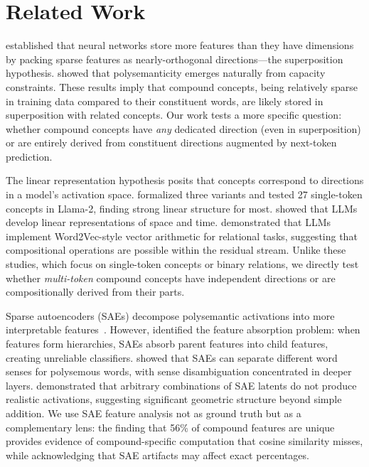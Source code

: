 \section{Related Work}
\label{sec:related_work}

\citet{elhage2022superposition} established that neural networks store more features than they have dimensions by packing sparse features as nearly-orthogonal directions---the superposition hypothesis.
\citet{scherlis2022polysemanticity} showed that polysemanticity emerges naturally from capacity constraints.
These results imply that compound concepts, being relatively sparse in training data compared to their constituent words, are likely stored in superposition with related concepts.
Our work tests a more specific question: whether compound concepts have \emph{any} dedicated direction (even in superposition) or are entirely derived from constituent directions augmented by next-token prediction.

The linear representation hypothesis posits that concepts correspond to directions in a model's activation space.
\citet{park2024linear} formalized three variants and tested 27 single-token concepts in Llama-2, finding strong linear structure for most.
\citet{gurnee2023language} showed that LLMs develop linear representations of space and time.
\citet{merullo2023language} demonstrated that LLMs implement Word2Vec-style vector arithmetic for relational tasks, suggesting that compositional operations are possible within the residual stream.
Unlike these studies, which focus on single-token concepts or binary relations, we directly test whether \emph{multi-token} compound concepts have independent directions or are compositionally derived from their parts.

Sparse autoencoders (SAEs) decompose polysemantic activations into more interpretable features~\citep{cunningham2023sparse,gao2024scaling,rajamanoharan2024gated}.
However, \citet{chanin2024absorption} identified the feature absorption problem: when features form hierarchies, SAEs absorb parent features into child features, creating unreliable classifiers.
\citet{minegishi2025rethinking} showed that SAEs can separate different word senses for polysemous words, with sense disambiguation concentrated in deeper layers.
\citet{giglemiani2024evaluating} demonstrated that arbitrary combinations of SAE latents do not produce realistic activations, suggesting significant geometric structure beyond simple addition.
We use SAE feature analysis not as ground truth but as a complementary lens: the finding that 56\% of compound features are unique provides evidence of compound-specific computation that cosine similarity misses, while acknowledging that SAE artifacts may affect exact percentages.

